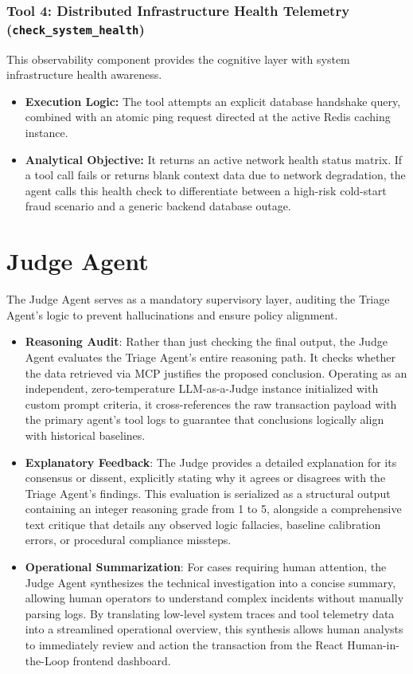 \documentclass[12pt]{report}
\begin{document}
\subsubsection{Tool 4: Distributed Infrastructure Health Telemetry (\texttt{check\_system\_health})}
This observability component provides the cognitive layer with system infrastructure health awareness.
\begin{itemize}
    \item \textbf{Execution Logic:} The tool attempts an explicit database handshake query, combined with an atomic ping request directed at the active Redis caching instance.
    \item \textbf{Analytical Objective:} It returns an active network health status matrix. If a tool call fails or returns blank context data due to network degradation, the agent calls this health check to differentiate between a high-risk cold-start fraud scenario and a generic backend database outage.
\end{itemize}

\section{Judge Agent}
The Judge Agent serves as a mandatory supervisory layer, auditing the Triage Agent's logic to prevent hallucinations and ensure policy alignment.
\begin{itemize}
    \item \textbf{Reasoning Audit}: Rather than just checking the final output, the Judge Agent evaluates the Triage Agent's entire reasoning path. It checks whether the data retrieved via MCP justifies the proposed conclusion. Operating as an independent, zero-temperature LLM-as-a-Judge instance initialized with custom prompt criteria, it cross-references the raw transaction payload with the primary agent's tool logs to guarantee that conclusions logically align with historical baselines.
    \item \textbf{Explanatory Feedback}: The Judge provides a detailed explanation for its consensus or dissent, explicitly stating why it agrees or disagrees with the Triage Agent's findings. This evaluation is serialized as a structural output containing an integer reasoning grade from 1 to 5, alongside a comprehensive text critique that details any observed logic fallacies, baseline calibration errors, or procedural compliance missteps.
    \item \textbf{Operational Summarization}: For cases requiring human attention, the Judge Agent synthesizes the technical investigation into a concise summary, allowing human operators to understand complex incidents without manually parsing logs. By translating low-level system traces and tool telemetry data into a streamlined operational overview, this synthesis allows human analysts to immediately review and action the transaction from the React Human-in-the-Loop frontend dashboard.
\end{itemize}
\end{document}
